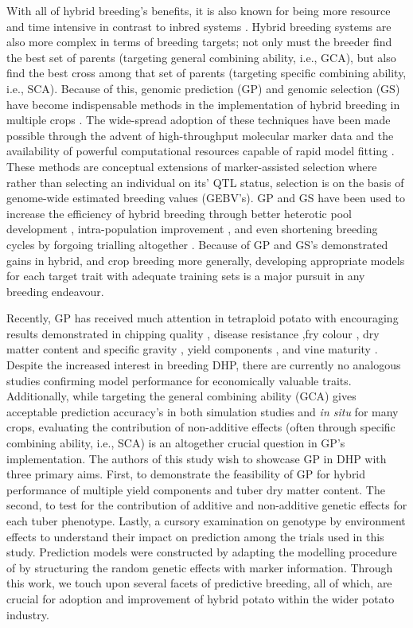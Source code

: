 With all of hybrid breeding's benefits, it is also known for being more resource and time intensive in contrast to inbred systems \cite{Labroo2021}. Hybrid breeding systems are also more complex in terms of breeding targets; not only must the breeder find the best set of parents (targeting general combining ability, i.e., GCA), but also find the best cross among that set of parents (targeting specific combining ability, i.e., SCA). Because of this, genomic prediction (GP) and genomic selection (GS) have become indispensable methods in the implementation of hybrid breeding in multiple crops \cite{Zhao2015a, Labroo2021}. The wide-spread adoption of these techniques have been made possible through the advent of high-throughput molecular marker data and the availability of powerful computational resources capable of rapid model fitting \cite{Meuwissen2001, Bernardo2016}. These methods are conceptual extensions of marker-assisted selection where rather than selecting an individual on its' QTL status, selection is on the basis of genome-wide estimated breeding values (GEBV's). GP and GS have been used to increase the efficiency of hybrid breeding through better heterotic pool development \cite{Rembe2019}, intra-population improvement \cite{Gaynor2017}, and even shortening breeding cycles by forgoing trialling altogether \cite{Heffner2010}. Because of GP and GS's demonstrated gains in hybrid, and crop breeding more generally, developing appropriate models for each target trait with adequate training sets is a major pursuit in any breeding endeavour. 

Recently, GP has received much attention in tetraploid potato with encouraging results demonstrated in chipping quality \cite{Sverrisdottir2018, Pandey2022}, disease resistance \cite{Enciso-Rodriguez2018, Ortiz2022},fry colour \cite{Byrne2020}, dry matter content and specific gravity \cite{Endelman2018, Sverrisdottir2018}, yield components \cite{Endelman2018, Wilson2021, Ortiz2022, Cuevas2022}, and vine maturity \cite{Slater2016, Pandey2022}. Despite the increased interest in breeding DHP, there are currently no analogous studies confirming model performance for economically valuable traits. Additionally, while targeting the general combining ability (GCA) gives acceptable prediction accuracy's in both simulation studies and \textit{in situ} for many crops, evaluating the contribution of non-additive effects (often through specific combining ability, i.e., SCA) is an altogether crucial question in GP's implementation. The authors of this study wish to showcase GP in DHP with three primary aims. First, to demonstrate the feasibility of GP for hybrid performance of multiple yield components and tuber dry matter content. The second, to test for the contribution of additive and non-additive genetic effects for each tuber phenotype. Lastly, a cursory examination on genotype by environment effects to understand their impact on prediction among the trials used in this study. Prediction models were constructed by adapting the modelling procedure of \cite{Adams2022} by structuring the random genetic effects with marker information. Through this work, we touch upon several facets of predictive breeding, all of which, are crucial for adoption and improvement of hybrid potato within the wider potato industry.


